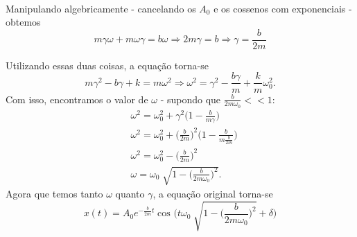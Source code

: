 \documentclass[PhysicsII/physicsII_notes.tex]{subfiles}
\begin{document}
\paragraph{}  Manipulando algebricamente - cancelando os \(A_{0}\) e os cossenos com exponenciais - obtemos
\[
	m\gamma \omega  + m\omega \gamma  = b\omega \Rightarrow 2m\gamma  = b \Rightarrow \gamma = \frac{b}{2m}
\]

Utilizando essas duas coisas, a equação torna-se
\[
	m\gamma ^{2} - b\gamma + k = m\omega ^{2} \Rightarrow \omega ^{2} = \gamma ^{2}-\frac{b\gamma }{m}+\frac{k}{m}\omega_{0}^{2}.
\]
Com isso, encontramos o valor de \(\omega\) - supondo que \(\frac{b}{2m\omega_{0}} <<1\):
\begin{align*}
	 & \omega ^{2} = \omega_{0}^{2} + \gamma ^{2}\biggl(1 - \frac{b}{m\gamma }\biggr)                        \\
	 & \omega ^{2} = \omega_{0}^{2} + \biggl(\frac{b}{2m}\biggr)^{2}\biggl(1-\frac{b}{m \frac{b}{2m}}\biggr) \\
	 & \omega ^{2} = \omega_{0}^{2} - \biggl(\frac{b}{2m}\biggr)^{2}                                         \\
	 & \omega  = \omega_{0}\sqrt[]{1-\biggl(\frac{b}{2m\omega_{0}}\biggr)^{2}}.
\end{align*}
Agora que temos tanto \(\omega \) quanto \(\gamma \), a equação original torna-se
\[
	\boxed{x(t) = A_{0}e^{-\frac{b}{2m}t}\cos^{}{\biggl(t\omega_{0}\sqrt[]{1-\biggl(\frac{b}{2m\omega_{0}}\biggr)^{2}}+\delta \biggr)}}
\]
\end{document}
